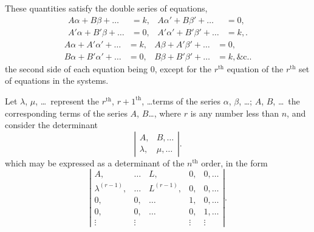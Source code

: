 \documentclass[11pt,a4paper]{book}
\begin{document}
These quantities satisfy the double series of equations,
\begin{align*}
A\alpha + B\beta + \ldots &= k, &
A\alpha' + B\beta' + \ldots &= 0, \\
A'\alpha + B'\beta + \ldots &= 0, &
A'\alpha' + B'\beta' + \ldots &= k,
\tag{5}.
\end{align*}
\begin{align*}
A\alpha + A'\alpha' + \ldots &= k, &
A\beta + A'\beta' + \ldots &= 0, \\
B\alpha + B'\alpha' + \ldots &= 0, &
B\beta + B'\beta' + \ldots &= k,
\&\text{c.}
\tag{6}.
\end{align*}
the second side of each equation being $0$, except for the $r^{\text{th}}$ equation of the $r^{\text{th}}$ set
of equations in the systems.

Let $\lambda$, $\mu$, \ldots\ represent the $r^{\text{th}}$, $r+1^{\text{th}}$, \ldots terms of the series $\alpha$, $\beta$, \ldots;
$A$, $B$, \ldots\ the corresponding terms of the series $A$, $B$\ldots, where $r$ is any number less
than $n$, and consider the determinant
\[
\left|\begin{array}{cc}
A, & B, \ldots \\
\lambda, & \mu, \ldots
\end{array}\right|
\tag{8}.
\]
which may be expressed as a determinant of the $n^{\text{th}}$ order, in the form
\[
\left|\begin{array}{cccccc}
A, & \ldots & L, & 0, & 0, \ldots \\
\lambda^{(r-1)}, & \ldots & L^{(r-1)}, & 0, & 0, \ldots \\
0, & 0, & \ldots & 1, & 0, \ldots \\
0, & 0, & \ldots & 0, & 1, \ldots \\
\vdots & \vdots & & \vdots & \vdots
\end{array}\right|
\tag{9}.
\]
\end{document}
